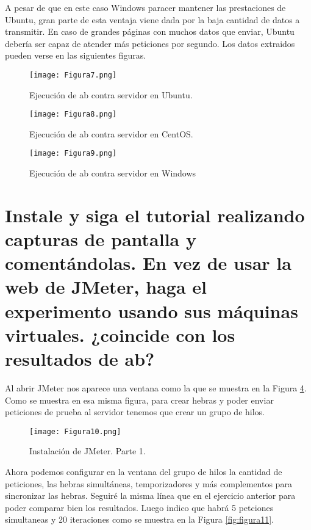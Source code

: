 \vspace{5mm} 

A pesar de que en este caso Windows paracer mantener las prestaciones de Ubuntu, gran parte de esta ventaja viene dada por la baja cantidad de datos a transmitir.
En caso de grandes páginas con muchos datos que enviar, Ubuntu debería ser capaz de atender más peticiones por segundo. Los datos extraidos pueden verse en 
las siguientes figuras.

\begin{figure}[H] 
\centering
\texttt{[image: Figura7.png]}  
\caption{Ejecución de ab contra servidor en Ubuntu.}\label{fig:figura7}
\end{figure}
\begin{figure}[H] 
\centering
\texttt{[image: Figura8.png]}  
\caption{Ejecución de ab contra servidor en CentOS.}\label{fig:figura8}
\end{figure}
\begin{figure}[H] 
\centering
\texttt{[image: Figura9.png]}  
\caption{Ejecución de ab contra servidor en Windows}\label{fig:figura9}
\end{figure}





\section{Instale y siga el tutorial realizando capturas de pantalla y comentándolas. En vez de usar la web de JMeter, haga el experimento usando sus máquinas virtuales. ¿coincide con los resultados de ab?}

Al abrir JMeter nos aparece una ventana como la que se muestra en la Figura \ref{fig:figura10}. Como se muestra en esa misma figura, para crear hebras y poder enviar
peticiones de prueba al servidor tenemos que crear un grupo de hilos. 

\begin{figure}[H] 
\centering
\texttt{[image: Figura10.png]}  
\caption{Instalación de JMeter. Parte 1.}\label{fig:figura10}
\end{figure}

Ahora podemos configurar en la ventana del grupo de hilos la cantidad de peticiones, las hebras simultáneas, temporizadores y más complementos para sincronizar
las hebras. Seguiré la misma línea que en el ejercicio anterior para poder comparar bien los resultados. Luego indico que habrá 5 petciones simultaneas y 20 
iteraciones como se muestra en la Figura \ref{fig:figura11}.

